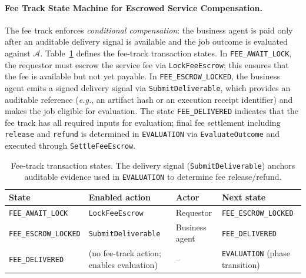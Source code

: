 \documentclass{article} %
\begin{document}
\paragraph{Fee Track State Machine for Escrowed Service Compensation.}
The fee track enforces \emph{conditional compensation}: the business agent is paid only after an auditable delivery signal is available and the job outcome is evaluated against $\mathcal{A}$. Table~\ref{tab:ARS-fee-states} defines the fee-track transaction states. In \texttt{FEE\_AWAIT\_LOCK}, the requestor must escrow the service fee via \texttt{LockFeeEscrow}; this ensures that the fee is available but not yet payable. In \texttt{FEE\_ESCROW\_LOCKED}, the business agent emits a signed delivery signal via \texttt{SubmitDeliverable}, which provides an auditable reference (\emph{e.g.}, an artifact hash or an execution receipt identifier) and makes the job eligible for evaluation. The state \texttt{FEE\_DELIVERED} indicates that the fee track has all required inputs for evaluation; final fee settlement including \texttt{release} and \texttt{refund} is determined in \texttt{EVALUATION} via \texttt{EvaluateOutcome} and executed through \texttt{SettleFeeEscrow}.

\begin{table}[!ht]
\centering
\small
\setlength{\tabcolsep}{5pt}
\renewcommand{\arraystretch}{1.2}
\begin{tabular}{p{3.3cm}p{3.0cm}p{2.7cm}p{4.0cm}}
\hline
\textbf{State} & \textbf{Enabled action} & \textbf{Actor} & \textbf{Next state} \\
\hline
\texttt{FEE\_AWAIT\_LOCK} &
\texttt{LockFeeEscrow} &
Requestor &
\texttt{FEE\_ESCROW\_LOCKED} \\
\texttt{FEE\_ESCROW\_LOCKED} &
\texttt{SubmitDeliverable} &
Business agent &
\texttt{FEE\_DELIVERED} \\
\texttt{FEE\_DELIVERED} &
(no fee-track action; enables evaluation) &
-- &
\texttt{EVALUATION} (phase transition) \\
\hline
\end{tabular}
\caption{Fee-track transaction states. The delivery signal (\texttt{SubmitDeliverable}) anchors auditable evidence used in \texttt{EVALUATION} to determine fee release/refund.}
\label{tab:ARS-fee-states}
\end{table}
\end{document}
